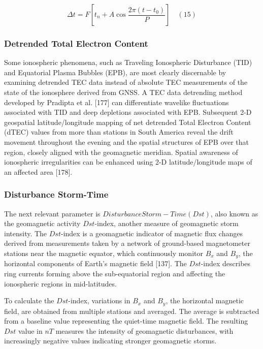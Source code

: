 \documentclass[sn-mathphys-num]{sn-jnl}%
\begin{document}
\begin{equation}
	\Delta t = F \left[ t_{n} + A \cos \frac{2\pi\left(t-t_{0}\right)}{P} \right]
	\quad\left(15\right)
\end{equation}

\subsubsection{Detrended Total Electron Content}

Some ionospheric phenomena, such as Traveling Ionospheric Disturbance (TID) and Equatorial Plasma Bubbles (EPB), are most clearly discernable by examining detrended TEC data instead of absolute TEC measurements of the state of the ionosphere derived from GNSS. A TEC data detrending method developed by Pradipta et al. [177] can differentiate wavelike fluctuations associated with TID and deep depletions associated with EPB. Subsequent 2-D geospatial latitude/longitude mapping of net detrended Total Electron Content (dTEC) values from more than stations in South America reveal the drift movement throughout the evening and the spatial structures of EPB over that region, closely aligned with the geomagnetic meridian. Spatial awareness of ionospheric irregularities can be enhanced using 2-D latitude/longitude maps of an affected area [178].

\subsubsection{Disturbance Storm-Time}

The next relevant parameter is $Disturbance Storm-Time (Dst)$, also known as the geomagnetic activity $Dst$-index, another measure of geomagnetic storm intensity. The $Dst$-index is a geomagnetic indicator of magnetic flux changes derived from measurements taken by a network of ground-based magnetometer stations near the magnetic equator, which continuously monitor $B_{x}$ and $B_{y}$, the horizontal components of Earth's magnetic field [137]. The $Dst$-index describes ring currents forming above the sub-equatorial region and affecting the ionospheric regions in mid-latitudes.

To calculate the $Dst$-index, variations in $B_{x}$ and $B_{y}$, the horizontal magnetic field, are obtained from multiple stations and averaged. The average is subtracted from a baseline value representing the quiet-time magnetic field. The resulting $Dst$ value in $nT$ measures the intensity of geomagnetic disturbances, with increasingly negative values indicating stronger geomagnetic storms. 
\end{document}
